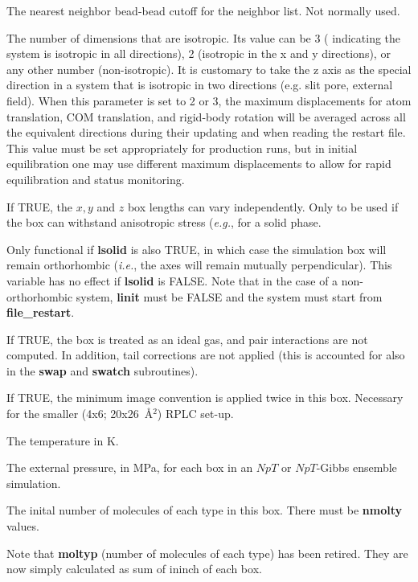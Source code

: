 \documentclass[12pt,letterpaper]{article}
\begin{document}
 The nearest neighbor bead-bead cutoff
for the neighbor list. Not normally used.

 The number of
dimensions that are isotropic. Its value can be 3 (
indicating the system is isotropic in all directions), 2
(isotropic in the x and y directions), or any other number
(non-isotropic). It is customary to take the z axis as the
special direction in a system that is isotropic in two
directions (e.g. slit pore, external field). When this
parameter is set to 2 or 3, the maximum displacements for
atom translation, COM translation, and rigid-body rotation
will be averaged across all the equivalent directions during
their updating and when reading the restart file. This value
must be set appropriately for production runs, but in
initial equilibration one may use different maximum
displacements to allow for rapid equilibration and status
monitoring.

 If TRUE, the $x, y$ and $z$ box
lengths can vary independently. Only to be used if the box
can withstand anisotropic stress (\textit{e.g.}, for a solid
phase.

 Only functional if {\bf lsolid} is
also TRUE, in which case the simulation box will remain
orthorhombic (\textit{i.e.}, the axes will remain mutually
perpendicular). This variable has no effect if {\bf lsolid}
is FALSE. Note that in the case of a non-orthorhombic
system, {\bf linit} must be FALSE and the system must start
from {\bf file\_restart}.

 If TRUE, the box is treated as an
ideal gas, and pair interactions are not computed. In
addition, tail corrections are not applied (this is
accounted for also in the {\bf swap} and {\bf swatch}
subroutines).

 If TRUE, the minimum image convention
is applied twice in this box. Necessary for the smaller
(4x6; 20x26~\AA$^2$) RPLC set-up.

 The temperature in K.

 The external pressure, in MPa, for
each box in an $NpT$ or $NpT$-Gibbs ensemble simulation.

 The inital number of molecules of each
type in this box. There must be {\bf nmolty} values.

Note that {\bf moltyp} (number of molecules of each type)
has been retired. They are now simply calculated as sum of
ininch of each box.
\end{document}

